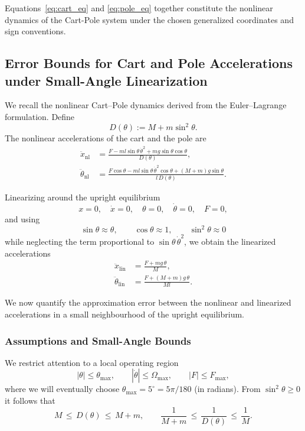 \documentclass{article}
\begin{document}
Equations~\eqref{eq:cart_eq} and \eqref{eq:pole_eq} together constitute the nonlinear dynamics of the Cart-Pole system under the chosen generalized coordinates and sign conventions.

\subsection{Error Bounds for Cart and Pole Accelerations under Small-Angle Linearization}

We recall the nonlinear Cart--Pole dynamics derived from the Euler--Lagrange formulation.
Define
\[
D(\theta) := M + m\sin^2\theta.
\]
The nonlinear accelerations of the cart and the pole are
\begin{align}
\ddot x_{\mathrm{nl}}
&=
\frac{
F - m l \sin\theta\,\dot\theta^2
 + m g \sin\theta\cos\theta
}{
D(\theta)
},
\label{eq:xddot_nl_def}
\\[2mm]
\ddot\theta_{\mathrm{nl}}
&=
\frac{
F\cos\theta
 - m l \sin\theta\,\dot\theta^2\cos\theta
 + (M+m) g\sin\theta
}{
l\,D(\theta)
}.
\label{eq:thddot_nl_def}
\end{align}

Linearizing around the upright equilibrium
\[
x = 0,\quad \dot x = 0,\quad \theta = 0,\quad \dot\theta = 0,\quad F = 0,
\]
and using
\[
\sin\theta \approx \theta,\qquad
\cos\theta \approx 1,\qquad
\sin^2\theta \approx 0
\]
while neglecting the term proportional to $\sin\theta\,\dot\theta^2$, we obtain the linearized accelerations
\begin{align}
\ddot x_{\mathrm{lin}} &= \frac{F + m g\,\theta}{M},\\[1mm]
\ddot\theta_{\mathrm{lin}} &= \frac{F + (M+m) g\,\theta}{M l}.
\end{align}

We now quantify the approximation error between the nonlinear and linearized accelerations in a small neighbourhood of the upright equilibrium.

\subsubsection*{Assumptions and Small-Angle Bounds}

We restrict attention to a local operating region
\[
|\theta| \le \theta_{\max},\qquad
|\dot\theta| \le \Omega_{\max},\qquad
|F| \le F_{\max},
\]
where we will eventually choose $\theta_{\max} = 5^\circ = 5\pi/180$ (in radians).
From $\sin^2\theta \ge 0$ it follows that
\begin{equation}
M \,\le\, D(\theta) \,\le\, M + m,
\qquad
\frac{1}{M+m} \,\le\, \frac{1}{D(\theta)} \,\le\, \frac{1}{M}.
\label{eq:D_bounds}
\end{equation}
\end{document}
